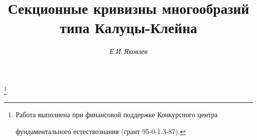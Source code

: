 

 




 


\newcommand{\im}{\operatorname{Im}} 


\newcommand{\grad}{\operatorname{grad}} 


\newcommand{\He}{\operatorname{He}} 


\newcommand{\rank}{\operatorname{rank}} 






 




 


\setcounter{page}{75} 












\author{\it Е.И.\,Яковлев} 


\title{Секционные кривизны многообразий\\ 


типа Калуцы-Клейна} 


 


\thanks{Работа выполнена при финансовой поддержке Конкурсного центра 


фундаментального естествознания (грант 95-0-1.3-87).} 


\date{} 




